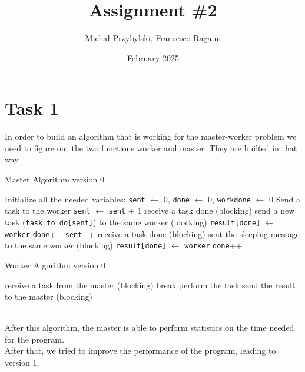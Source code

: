 \documentclass[a4paper]{article}
\title{Assignment \#2}
\author{Michał Przybylski, Francesco Ragaini}
\date{February 2025}
\theoremstyle{definition}
\theoremstyle{remark}
\begin{document}
\maketitle
\section*{Task 1}
\tab 
In order to build an algorithm that is working for the master-worker problem we need to figure out the 
two functions worker and master. They are builted in that way\\
\begin{minipage}{0.45\textwidth}
\begin{algorithm}[H]
\caption{Master Algorithm version 0}
\begin{algorithmic}[1]
\State Initialize all the needed variables: \texttt{sent} $\gets$ 0, \texttt{done} $\gets$ 0, \texttt{workdone} $\gets$ 0
    \State Send a task to the worker
    \State \texttt{sent} $\gets$ \texttt{sent} + 1
\EndFor
{}
    \State receive a task done (blocking)
    \State send a new task (\texttt{task\_to\_do[sent]}) to the same worker (blocking)
    \State \texttt{result[done]} $\gets$ \texttt{worker}
    \State \texttt{done}++
    \State \texttt{sent}++
\EndWhile
{}
    \State receive a task done (blocking)
    \State sent the sleeping message to the same worker (blocking)
    \State \texttt{result[done]} $\gets$ \texttt{worker}
    \State \texttt{done}++
\EndFor
\end{algorithmic}
\end{algorithm}
\end{minipage}
\hfill
\begin{minipage}{0.45\textwidth}
\begin{algorithm}[H]
\caption{Worker Algorithm version 0}
\begin{algorithmic}[1]
    \State receive a task from the master (blocking)
        \State break
    \EndIf
    \State perform the task
    \State send the result to the master (blocking)
\EndWhile
\end{algorithmic}
\end{algorithm}
\end{minipage}\\
After this algorithm, the master is able to perform statistics on the time needed for the program.\\
After that, we tried to improve the performance of the program, leading to version 1, 
\end{document}
